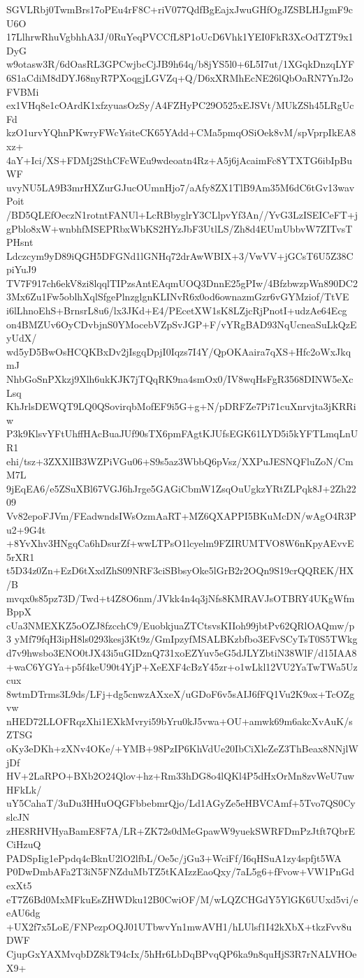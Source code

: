 SGVLRbj0TwmBrs17oPEu4rF8C+riV077QdfBgEajxJwuGHfOgJZSBLHJgmF9cU6O
17LlhrwRhuVgbhhA3J/0RuYeqPVCCfL8P1oUcD6Vhk1YEI0FkR3XcOdTZT9x1DyG
w9otasw3R/6dOasRL3GPCwjbcCjJB9h64q/b8jYS5l0+6L5I7ut/1XGqkDnzqLYF
6S1aCdiM8dDYJ68nyR7PXoqgjLGVZq+Q/D6xXRMhEcNE26lQbOaRN7YnJ2oFVBMi
ex1VHq8e1cOArdK1xfzyuasOzSy/A4FZHyPC29O525xEJSVt/MUkZSh45LRgUcFd
kzO1urvYQhnPKwryFWcYsiteCK65YAdd+CMa5pmqOSiOek8vM/spVprpIkEA8xz+
4aY+Ici/XS+FDMj2SthCFcWEu9wdeoatn4Rz+A5j6jAcaimFc8YTXTG6ibIpBuWF
uvyNU5LA9B3mrHXZurGJucOUmnHjo7/aAfy8ZX1TlB9Am35M6dC6tGv13wavPoit
/BD5QLEfOeczN1rotntFANUl+LcRBbyglrY3CLlpvYf3An//YvG3LzISEICeFT+j
gPblo8xW+wnbhfMSEPRbxWbKS2HYzJbF3UtlLS/Zh8d4EUmUbbvW7ZITvsTPHsnt
Ldczcym9yD89iQGH5DFGNd1lGNHq72drAwWBIX+3/VwVV+jGCsT6U5Z38CpiYuJ9
TV7F917ch6ekV8zi8lqqlTIPzsAntEAqmUOQ3DnnE25gPIw/4BfzbwzpWn890DC2
3Mx6Zu1Fw5oblhXqlSfgePlnzglgnKLINvR6x0od6ownazmGzr6vGYMziof/TtVE
i6lLhnoEhS+BrnsrL8u6/lx3JKd+E4/PEcetXW1sK8LZjcRjPnotI+udzAe64Ecg
on4BMZUv6OyCDvbjnS0YMocebVZpSvJGP+F/vYRgBAD93NqUcneaSuLkQzEyUdX/
wd5yD5BwOsHCQKBxDv2jIsgqDpjI0Iqzs7I4Y/QpOKAaira7qXS+Hfc2oWxJkqmJ
NhbGoSnPXkzj9Xlh6ukKJK7jTQqRK9na4smOx0/IV8wqHsFgR3568DINW5eXcLsq
KhJrlsDEWQT9LQ0QSovirqbMofEF9i5G+g+N/pDRFZe7Pi71cuXnrvjta3jKRRiw
P3k9KlsvYFtUhffHAcBuaJUf90sTX6pmFAgtKJUfsEGK61LYD5i5kYFTLmqLnUR1
ehi/tsz+3ZXXlIB3WZPiVGu06+S9s5az3WbbQ6pVsz/XXPuJESNQFluZoN/CmM7L
9jEqEA6/e5ZSuXBl67VGJ6hJrge5GAGiCbmW1ZsqOuUgkzYRtZLPqk8J+2Zh2209
Vv82epoFJVm/FEadwndsIWsOzmAaRT+MZ6QXAPPI5BKuMcDN/wAgO4R3Pu2+9G4t
+8YvXhv3HNgqCa6hDsurZf+wwLTPsO1lcyelm9FZIRUMTVO8W6nKpyAEvvE5rXR1
t5D34z0Zn+EzD6tXxdZhS09NRF3ciSBbsyOke5lGrB2r2OQn9S19crQQREK/HX/B
mvqx0s85pz73D/Twd+t4Z8O6nm/JVkk4n4q3jNfs8KMRAVJsOTBRY4UKgWfmBppX
cUa3NMEXKZ5oOZJ8fzcchC9/EuobkjuaZTCtsvsKIIoh99jbtPv62QRlOAQmw/p3
yMf79fqH3ipH8ls0293kesj3Kt9z/GmIpzyfMSALBKzbfbo3EFvSCyTsT0S5TWkg
d7v9hwsbo3ENO0tJX43i5uGIDznQ731xoEZYuv5eG5dJLYZbtiN38WlF/d15IAA8
+waC6YGYa+p5f4keU90t4YjP+XeEXF4cBzY45zr+o1wLkl12VU2YaTwTWa5Uzcux
8wtmDTrms3L9ds/LFj+dg5cnwzAXxeX/uGDoF6v5sAIJ6fFQ1Vu2K9ox+TcOZgvw
nHED72LLOFRqzXhi1EXkMvryi59bYru0kJ5vwa+OU+amwk69m6akcXvAuK/sZTSG
oKy3eDKh+zXNv4OKe/+YMB+98PzIP6KhVdUe20IbCiXleZeZ3ThBeax8NNjlWjDf
HV+2LaRPO+BXb2O24Qlov+hz+Rm33hDG8o4lQKl4P5dHxOrMn8zvWeU7uwHFkLk/
uY5CahaT/3uDu3HHuOQGFbbebmrQjo/Ld1AGyZe5eHBVCAmf+5Tvo7QS0CyslcJN
zHE8RHVHyaBamE8F7A/LR+ZK72s0dMeGpawW9yuekSWRFDmPzJtft7QbrECiHzuQ
PADSpIig1ePpdq4cBknU2lO2lfbL/Oe5c/jGu3+WciFf/I6qHSuA1zy4spfjt5WA
P0DwDmbAFa2T3iN5FNZduMbTZ5tKAIzzEaoQxy/7aL5g6+fFvow+VW1PnGdexXt5
eT7Z6Bd0MxMFkuEsZHWDku12B0CwiOF/M/wLQZCHGdY5YlGK6UUxd5vi/eeAU6dg
+UX2f7x5LoE/FNPezpOQJ01UTbwvYn1mwAVH1/hLUlsf1I42kXbX+tkzFvv8uDWF
CjupGxYAXMvqbDZ8kT94cIx/5hHr6LbDqBPvqQP6ka9n8quHjS3R7rNALVHOeX9+
